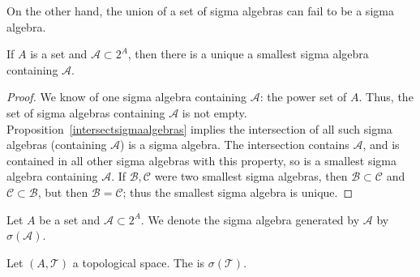 On the other hand, the union of a set
of sigma algebras can fail to be a
sigma algebra.

\begin{prop}
  If $A$ is a set and
  $\mathcal{A} \subset 2^A$,
  then
  there is a unique a smallest sigma algebra
  containing $\mathcal{A}$.

  \begin{proof}
    We know of one sigma algebra containing $\mathcal{A}$:
    the power set of $A$.
    Thus, the set of sigma algebras containing
    $\mathcal{A}$ is not empty.
    Proposition~\ref{intersectsigmaalgebras}
    implies
    the intersection of all
    such sigma algebras
    (containing $\mathcal{A}$) is a sigma algebra.
    The intersection contains $\mathcal{A}$,
    and is contained in all other sigma algebras
    with this property, so is a smallest sigma
    algebra containing $\mathcal{A}$.
    If $\mathcal{B}, \mathcal{C}$ were two smallest
    sigma algebras, then $\mathcal{B} \subset \mathcal{C}$
    and $\mathcal{C} \subset \mathcal{B}$, but then
    $\mathcal{B} = \mathcal{C}$; thus the smallest
    sigma algebra is unique.
  \end{proof}
\end{prop}


Let $A$ be a set and
$\mathcal{A} \subset 2^A$.
We denote the sigma algebra
generated by $\mathcal{A}$
by $\sigma(\mathcal{A})$.



\begin{expl}
  Let $(A, \mathcal{T})$ a topological space.
  The
  is $\sigma(\mathcal{T})$.
\end{expl}

\strats
